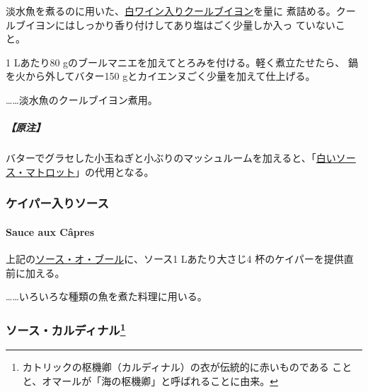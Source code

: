 \begin{recette}
淡水魚を煮るのに用いた、\href{}{白ワイン入りクールブイヨン}を\untiers{}量に
煮詰める。クールブイヨンにはしっかり香り付けしてあり塩はごく少量しか入っ
ていないこと。

1 Lあたり80 gのブールマニエを加えてとろみを付ける。軽く煮立たせたら、
鍋を火から外してバター150 gとカイエンヌごく少量を加えて仕上げる。

\ldots{}\ldots{}淡水魚のクールブイヨン煮用。

\hypertarget{ux539fux6ce8-2}{%
\subparagraph{【原注】}\label{ux539fux6ce8-2}}

バターでグラセした小玉ねぎと小ぶりのマッシュルームを加えると、「\protect\hyperlink{sauce-matelote-blanche}{白いソー
ス・マトロット}」の代用となる。

\maeaki

\hypertarget{ux30b1ux30a4ux30d1ux30fcux5165ux308aux30bdux30fcux30b9}{%
\subsubsection{ケイパー入りソース}\label{ux30b1ux30a4ux30d1ux30fcux5165ux308aux30bdux30fcux30b9}}

\hypertarget{sauce-aux-capres}{%
\paragraph{Sauce aux Câpres}\label{sauce-aux-capres}}


上記の\protect\hyperlink{sauce-au-beurre}{ソース・オ・ブール}に、ソース1
Lあたり大さじ4 杯のケイパーを提供直前に加える。

\ldots{}\ldots{}いろいろな種類の魚を煮た料理に用いる。

\maeaki

\hypertarget{ux30bdux30fcux30b9ux30abux30ebux30c7ux30a3ux30caux30eb21}{%
\subsubsection[ソース・カルディナル]{\texorpdfstring{ソース・カルディナル\footnote{カトリックの枢機卿（カルディナル）の衣が伝統的に赤いものである
  ことと、オマールが「海の枢機卿」と呼ばれることに由来。}}{ソース・カルディナル}}\label{ux30bdux30fcux30b9ux30abux30ebux30c7ux30a3ux30caux30eb21}}

\hypertarget{sauce-cardinal}{%
}
\end{recette}
